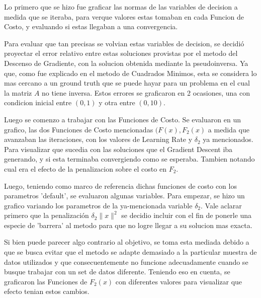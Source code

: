 \documentclass{article}
\begin{document}
\noindent Lo primero que se hizo fue graficar las normas de las variables de decision a medida que se iteraba, para verque valores estas tomaban en cada Funcion de Costo, y evaluando si estas llegaban a una convergencia. \vspace{\baselineskip}

\noindent Para evaluar que tan precisas se volvian estas variables de decision, se decidió proyectar el error relativo entre estas soluciones provistas por el metodo del Descenso de Gradiente, con la solucion obtenida mediante la pseudoinversa. Ya que, como fue explicado en el metodo de Cuadrados Minimos, esta se considera lo mas cercano a un ground truth que se puede hayar para un problema en el cual la matriz $A$ no tiene inversa. Estos errores se graficaron en 2 ocasiones, una con condicion inicial entre $(0, 1)$ y otra entre $(0, 10)$. \vspace{\baselineskip}

\noindent Luego se comenzo a trabajar con las Funciones de Costo. Se evaluaron en un grafico, las dos Funciones de Costo mencionadas $(F(x), F_2(x)$ a medida que avanzaban las iteraciones, con los valores de Learning Rate y $\delta_2$ ya mencionados. Para visualizar que sucedia con las soluciones que el Gradient Descent iba generando, y si esta terminaba convergiendo como se esperaba. Tambien notando cual era el efecto de la penalizacion sobre el costo en $F_2$. \vspace{\baselineskip}

\noindent Luego, teniendo como marco de referencia dichas funciones de costo con los parametros 'default', se evaluaron algunas variables. Para empezar, se hizo un grafico variando los parametros de la ya-mencionada variable $\delta_2$. Vale aclarar primero que la penalización \(\delta_2 \|x\|^2\) se decidio incluir con el fin de ponerle una especie de 'barrera' al metodo para que no logre llegar a su solucion mas exacta. \vspace{\baselineskip}

\noindent  Si bien puede parecer algo contrario al objetivo, se toma esta mediada debido a que se busca evitar que el metodo se adapte demasiado a la particular muestra de datos utilizados y que consecuentemente no funcione adecuadamente cuando se busque trabajar con un set de datos diferente. Teniendo eso en cuenta, se graficaron las Funciones de $F_2(x)$ con diferentes valores para visualizar que efecto tenian estos cambios. \vspace{\baselineskip}
\end{document}
